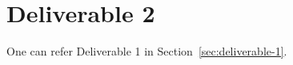 \section{Deliverable 2}
\label{sec:deliverable-2}

One can refer Deliverable 1 in Section~\ref{sec:deliverable-1}.
